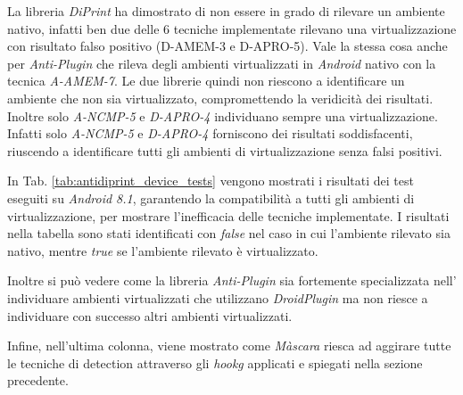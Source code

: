 La libreria \emph{DiPrint} ha dimostrato di non essere in grado di rilevare un ambiente nativo, infatti ben due delle 6 tecniche implementate rilevano una virtualizzazione con risultato falso positivo (D-AMEM-3 e D-APRO-5).
Vale la stessa cosa anche per \emph{Anti-Plugin} che rileva degli ambienti virtualizzati in \emph{Android} nativo con la tecnica \emph{A-AMEM-7}.
Le due librerie quindi non riescono a identificare un ambiente che non sia virtualizzato, compromettendo la veridicità dei risultati.
Inoltre solo \emph{A-NCMP-5} e \emph{D-APRO-4} individuano sempre una virtualizzazione.
Infatti solo \emph{A-NCMP-5} e \emph{D-APRO-4} forniscono dei risultati soddisfacenti, riuscendo a identificare tutti gli ambienti di virtualizzazione senza falsi positivi.

In Tab. \ref{tab:antidiprint_device_tests} vengono mostrati i risultati dei test eseguiti su \emph{Android 8.1}, garantendo la compatibilità a tutti gli ambienti di virtualizzazione, per mostrare l'inefficacia delle tecniche implementate. 
I risultati nella tabella sono stati identificati con \emph{false} nel caso in cui l'ambiente rilevato sia nativo, mentre \emph{true} se l'ambiente rilevato è virtualizzato.

Inoltre si può vedere come la libreria \emph{Anti-Plugin} sia fortemente specializzata nell' individuare ambienti virtualizzati che utilizzano \emph{DroidPlugin} ma non riesce a individuare con successo altri ambienti virtualizzati.

Infine, nell'ultima colonna, viene mostrato come \emph{Màscara} riesca ad aggirare tutte le tecniche di detection attraverso gli \emph{\gls{hookg}} applicati e spiegati nella sezione precedente.
\newpage



